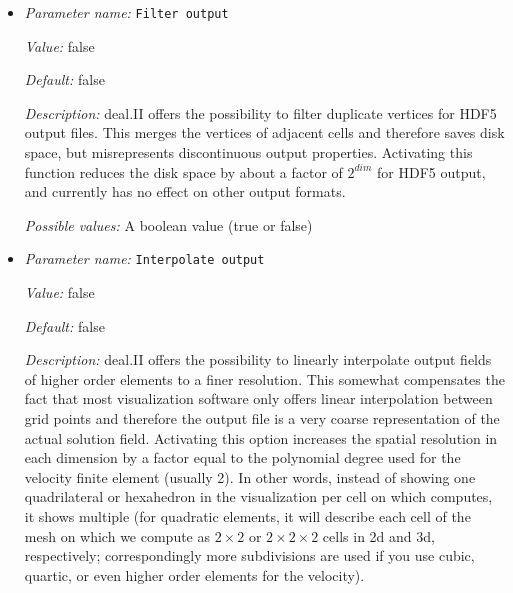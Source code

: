 \begin{itemize}
\item {\it Parameter name:} {\tt Filter output}
\label{parameters:Postprocess/Visualization/Filter output}
\label{parameters:Postprocess/Visualization/Filter_20output}


{\it Value:} false


{\it Default:} false


{\it Description:} deal.II offers the possibility to filter duplicate vertices for HDF5 output files. This merges the vertices of adjacent cells and therefore saves disk space, but misrepresents discontinuous output properties. Activating this function reduces the disk space by about a factor of $2^{dim}$ for HDF5 output, and currently has no effect on other output formats. 


{\it Possible values:} A boolean value (true or false)
\item {\it Parameter name:} {\tt Interpolate output}
\label{parameters:Postprocess/Visualization/Interpolate output}
\label{parameters:Postprocess/Visualization/Interpolate_20output}


{\it Value:} false


{\it Default:} false


{\it Description:} deal.II offers the possibility to linearly interpolate output fields of higher order elements to a finer resolution. This somewhat compensates the fact that most visualization software only offers linear interpolation between grid points and therefore the output file is a very coarse representation of the actual solution field. Activating this option increases the spatial resolution in each dimension by a factor equal to the polynomial degree used for the velocity finite element (usually 2). In other words, instead of showing one quadrilateral or hexahedron in the visualization per cell on which \aspect{} computes, it shows multiple (for quadratic elements, it will describe each cell of the mesh on which we compute as $2\times 2$ or $2\times 2\times 2$ cells in 2d and 3d, respectively; correspondingly more subdivisions are used if you use cubic, quartic, or even higher order elements for the velocity).


\end{itemize}
